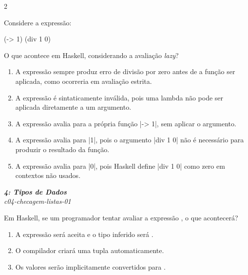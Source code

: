 \documentclass[a4paper,10pt,brazil]{article}
\begin{document}
\begin{multicols}{2}
\begin{flushright}
\end{flushright}
Considere a expressão:

\begin{haskellcode}
(\x -> 1) (div 1 0)
\end{haskellcode}

O que acontece em Haskell, considerando a avaliação \emph{lazy}?

\begin{enumerate}
  \item A expressão sempre produz erro de divisão por zero antes de a função ser aplicada, como ocorreria em avaliação estrita.

  \item A expressão é sintaticamente inválida, pois uma lambda não pode ser aplicada diretamente a um argumento.

  \item A expressão avalia para a própria função \haskellinline|\x -> 1|, sem aplicar o argumento.

  \item A expressão avalia para \haskellinline|1|, pois o argumento \haskellinline|div 1 0| não é necessário para produzir o resultado da função.

  \item A expressão avalia para \haskellinline|0|, pois Haskell define \haskellinline|div 1 0| como zero em contextos não usados.


\end{enumerate}

\begin{flushright}
  \footnotesize
  \textit{\textbf{4: Tipos de Dados}}\\
  \textit{c04-checagem-listas-01}\\

\end{flushright}
Em Haskell, se um programador tentar avaliar a expressão , o que acontecerá?

\begin{enumerate}
  \item A expressão será aceita e o tipo inferido será .

  \item O compilador criará uma tupla automaticamente.

  \item Os valores serão implicitamente convertidos para .


\end{enumerate}
\end{multicols}
\end{document}
